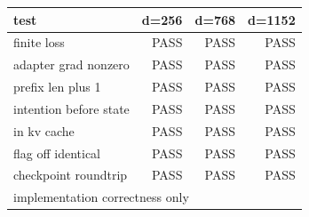 \begin{tabular}{lrrr}
\toprule
test & d=256 & d=768 & d=1152 \\
\midrule
finite loss & PASS & PASS & PASS \\
adapter grad nonzero & PASS & PASS & PASS \\
prefix len plus 1 & PASS & PASS & PASS \\
intention before state & PASS & PASS & PASS \\
in kv cache & PASS & PASS & PASS \\
flag off identical & PASS & PASS & PASS \\
checkpoint roundtrip & PASS & PASS & PASS \\
\midrule
\multicolumn{4}{l}{implementation correctness only} \\
\bottomrule
\end{tabular}
